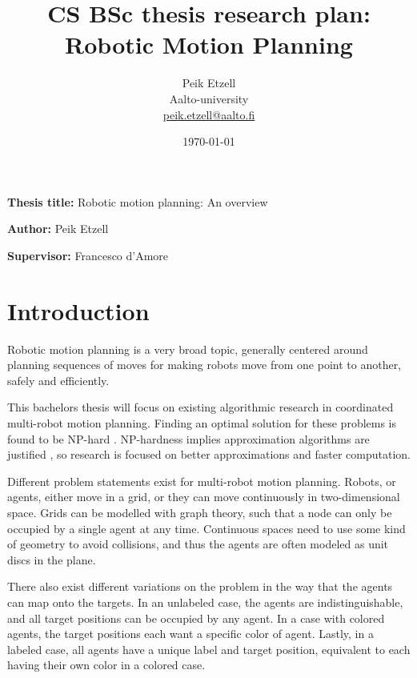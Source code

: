 \documentclass[12pt,a4paper,english,oneside]{article}
\begin{document}

\title{CS BSc thesis research plan:\\[5mm]
Robotic Motion Planning}

\author{Peik Etzell\\
Aalto-university\\
\url{peik.etzell@aalto.fi}}

\date{\today}

\maketitle


\vspace{10mm}

\textbf{Thesis title:} Robotic motion planning: An overview %

\textbf{Author:} Peik Etzell

\textbf{Supervisor:} Francesco d'Amore


\section{Introduction}

Robotic motion planning is a very broad topic, generally centered around planning sequences of moves for making robots move from one point to another, safely and efficiently. 

This bachelors thesis will focus on existing algorithmic research in coordinated multi-robot motion planning.
Finding an optimal solution for these problems is found to be NP-hard \cite{demaine_coordinated_2019}. NP-hardness implies approximation algorithms are justified \cite{demaine_coordinated_2019}, so research is focused on better approximations and faster computation. 

Different problem statements exist for multi-robot motion planning. Robots, or agents, either move in a grid, or they can move continuously in two-dimensional space. 
Grids can be modelled with graph theory, such that a node can only be occupied by a single agent at any time. 
Continuous spaces need to use some kind of geometry to avoid collisions, and thus the agents are often modeled as unit discs in the plane. 

There also exist different variations on the problem in the way that the agents can map onto the targets. In an unlabeled case, the agents are indistinguishable, and all target positions can be occupied by any agent. In a case with colored agents, the target positions each want a specific color of agent. Lastly, in a labeled case, all agents have a unique label and target position, equivalent to each having their own color in a colored case.
\end{document}
